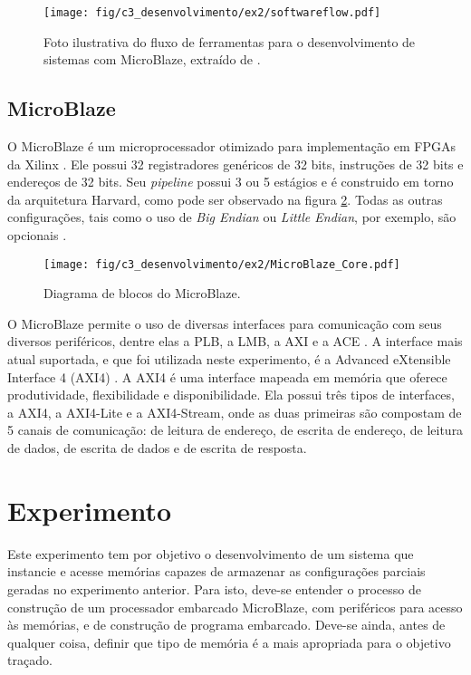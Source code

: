 \documentclass[11pt,a4paper,oneside]{book}
\begin{document}
\begin{figure}[htp]
\centering
\texttt{[image: fig/c3\_desenvolvimento/ex2/softwareflow.pdf]}
\caption{Foto ilustrativa do fluxo de ferramentas para o desenvolvimento de sistemas com MicroBlaze, extraído de \cite{ug081}.}
\label{fig:ex2:softwareflow}
\end{figure}

\subsection{MicroBlaze}
O MicroBlaze é um microprocessador otimizado para implementação em FPGAs da Xilinx \cite{ug081}.
Ele possui 32 registradores genéricos de 32 bits, instruções de 32 bits e endereços de 32 bits.
Seu \textit{pipeline} possui 3 ou 5 estágios e é construido em torno da arquitetura Harvard, como pode ser observado na figura \ref{fig:ex3:microblazecore}.
Todas as outras configurações, tais como o uso de \textit{Big Endian} ou \textit{Little Endian}, por exemplo, são opcionais \cite{ug081}.

\begin{figure}[h]
\centering
\texttt{[image: fig/c3\_desenvolvimento/ex2/MicroBlaze\_Core.pdf]}
\caption{Diagrama de blocos do MicroBlaze.}
\label{fig:ex3:microblazecore}
\end{figure}

O MicroBlaze permite o uso de diversas interfaces para comunicação com seus diversos periféricos, dentre elas a PLB, a LMB, a AXI e a ACE \cite{ug081}.
A interface mais atual suportada, e que foi utilizada neste experimento, é a Advanced eXtensible Interface 4 (AXI4) \cite{ug081, ug761}.
A AXI4 é uma interface mapeada em memória que oferece produtividade, flexibilidade e disponibilidade.
Ela possui três tipos de interfaces, a AXI4, a AXI4-Lite e a AXI4-Stream, onde as duas primeiras são compostam de 5 canais de comunicação: de leitura de endereço, de escrita de endereço, de leitura de dados, de escrita de dados e de escrita de resposta.

\section{Experimento}
Este experimento tem por objetivo o desenvolvimento de um sistema que instancie e acesse memórias capazes de armazenar as configurações parciais geradas no experimento anterior.
Para isto, deve-se entender o processo de construção de um processador embarcado MicroBlaze, com periféricos para acesso às memórias, e de construção de programa embarcado.
Deve-se ainda, antes de qualquer coisa, definir que tipo de memória é a mais apropriada para o objetivo traçado.
\end{document}
